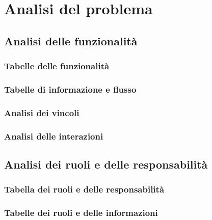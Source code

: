 \documentclass{article}
\begin{document}

\pagebreak
\section{Analisi del problema}
\subsection{Analisi delle funzionalità}
\subsubsection{Tabelle delle funzionalità}

\subsubsection{Tabelle di informazione e flusso}

\subsubsection{Analisi dei vincoli}

\subsubsection{Analisi delle interazioni}


\subsection{Analisi dei ruoli e delle responsabilità}
\subsubsection{Tabella dei ruoli e delle responsabilità}

\subsubsection{Tabelle dei ruoli e delle informazioni}

\end{document}
